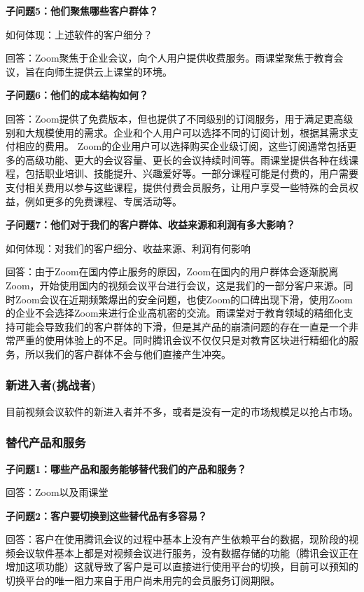 \documentclass[a4paper,12pt]{article}
\begin{document}
    \textbf{子问题5：他们聚焦哪些客户群体？}

    如何体现：上述软件的客户细分？

    回答：Zoom聚焦于企业会议，向个⼈⽤户提供收费服务。⾬课堂聚焦于教育会议，旨在向师⽣提供云上课堂的环境。
    
    \textbf{子问题6：他们的成本结构如何？}

    回答：Zoom提供了免费版本，但也提供了不同级别的订阅服务，用于满足更高级别和大规模使用的需求。企业和个人用户可以选择不同的订阅计划，根据其需求支付相应的费用。 Zoom的企业用户可以选择购买企业级订阅，这些订阅通常包括更多的高级功能、更大的会议容量、更长的会议持续时间等。雨课堂提供各种在线课程，包括职业培训、技能提升、兴趣爱好等。一部分课程可能是付费的，用户需要支付相关费用以参与这些课程，提供付费会员服务，让用户享受一些特殊的会员权益，例如更多的免费课程、专属活动等。
    
    \textbf{子问题7：他们对于我们的客户群体、收益来源和利润有多大影响？}

    如何体现：对我们的客户细分、收益来源、利润有何影响

    回答：由于Zoom在国内停⽌服务的原因，Zoom在国内的⽤户群体会逐渐脱离Zoom，开始使⽤国内的视频会议平台进⾏会议，这是我们的⼀部分客户来源。同时Zoom会议在近期频繁爆出的安全问题，也使Zoom的⼝碑出现下滑，使⽤Zoom的企业不会选择Zoom来进⾏企业⾼机密的交流。⾬课堂对于教育领域的精细化⽀持可能会导致我们的客户群体的下滑，但是其产品的崩溃问题的存在⼀直是⼀个⾮常严重的使⽤体验上的不⾜。同时腾讯会议不仅仅只是对教育区块进⾏精细化的服务，所以我们的客户群体不会与他们直接产⽣冲突。
    
    \subsubsection{新进入者(挑战者)}
    目前视频会议软件的新进入者并不多，或者是没有⼀定的市场规模足以抢占市场。
    \subsubsection{替代产品和服务}
    \textbf{子问题1：哪些产品和服务能够替代我们的产品和服务？}

    回答：Zoom以及⾬课堂

    \textbf{子问题2：客户要切换到这些替代品有多容易？}

    回答：客户在使⽤腾讯会议的过程中基本上没有产⽣依赖平台的数据，现阶段的视频会议软件基本上都是对视频会议进⾏服务，没有数据存储的功能（腾讯会议正在增加这项功能）这就导致了客户是可以直接进⾏使⽤平台的切换，⽬前可以预知的切换平台的唯一阻⼒来⾃于⽤户尚未⽤完的会员服务订阅期限。
\end{document}
